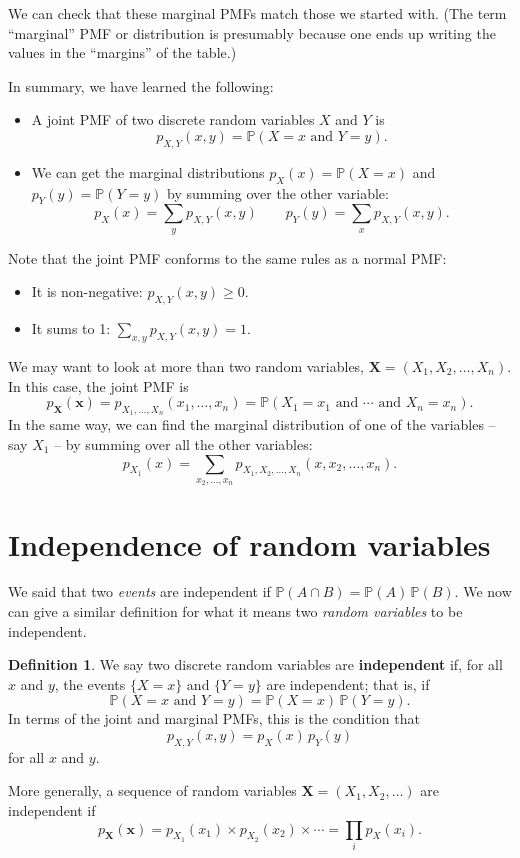 \documentclass[
  a4paper,
]{book}
\providecommand{\tightlist}{%
  \setlength{\itemsep}{0pt}\setlength{\parskip}{0pt}}
\theoremstyle{definition}
\newtheorem{definition}{Definition}[chapter]
\theoremstyle{definition}
\theoremstyle{definition}
\theoremstyle{definition}
\theoremstyle{remark}
\begin{document}
We can check that these marginal PMFs match those we started with. (The term ``marginal'' PMF or distribution is presumably because one ends up writing the values in the ``margins'' of the table.)

In summary, we have learned the following:

\begin{itemize}
\tightlist
\item
  A joint PMF of two discrete random variables \(X\) and \(Y\) is
  \[ p_{X,Y}(x, y) = \mathbb P(X = x \text{ and } Y = y) . \]
\item
  We can get the marginal distributions \(p_X(x) = \mathbb P(X = x)\) and \(p_Y(y) = \mathbb P(Y = y)\) by summing over the other variable:
  \[ p_X(x) = \sum_y p_{X,Y}(x,y) \qquad p_Y(y) = \sum_x p_{X,Y}(x,y) . \]
\end{itemize}

Note that the joint PMF conforms to the same rules as a normal PMF:

\begin{itemize}
\item
  It is non-negative: \(p_{X,Y}(x,y) \geq 0\).
\item
  It sums to 1: \(\displaystyle\sum_{x,y} p_{X,Y}(x,y) = 1\).
\end{itemize}

We may want to look at more than two random variables, \(\mathbf X = (X_1, X_2, \dots, X_n)\). In this case, the joint PMF is
\[ p_{\mathbf X}(\mathbf x) = p_{X_1, \dots, X_n}(x_1, \dots, x_n) = \mathbb P(X_1 = x_1 \text{ and } \cdots \text{ and } X_n = x_n) .   \]
In the same way, we can find the marginal distribution of one of the variables -- say \(X_1\) -- by summing over all the other variables:
\[ p_{X_1}(x) = \sum_{x_2, \dots, x_n} p_{X_1, X_2, \dots, X_n}(x, x_2, \dots, x_n) . \]

\hypertarget{independence-rv}{%
\section{Independence of random variables}\label{independence-rv}}

We said that two \emph{events} are independent if \(\mathbb P(A \cap B) = \mathbb P(A)\, \mathbb P(B)\). We now can give a similar definition for what it means two \emph{random variables} to be independent.

\begin{definition}
We say two discrete random variables are \textbf{independent} if, for all \(x\) and \(y\), the events \(\{X = x\}\) and \(\{Y = y\}\) are independent; that is, if
\[ \mathbb P(X = x \text{ and } Y = y) = \mathbb P(X = x) \, \mathbb P(Y = y) . \]
In terms of the joint and marginal PMFs, this is the condition that
\[ p_{X,Y}(x,y) = p_X(x) \, p_Y(y)  \]
for all \(x\) and \(y\).

More generally, a sequence of random variables \(\mathbf X = (X_1, X_2, \dots)\) are independent if
\[ p_{\mathbf X}(\mathbf x) = p_{X_1}(x_1) \times p_{X_2}(x_2) \times \cdots = \prod_{i} p_X(x_i). \]
\end{definition}
\end{document}
